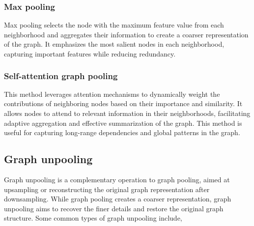 \subsubsection{Max pooling} Max pooling selects the node with the maximum feature value from each neighborhood and aggregates their information to create a coarser representation of the graph. It emphasizes the most salient nodes in each neighborhood, capturing important features while reducing redundancy.
\subsubsection{Self-attention graph pooling} This method leverages attention mechanisms to dynamically weight the contributions of neighboring nodes based on their importance and similarity. It allows nodes to attend to relevant information in their neighborhoods, facilitating adaptive aggregation and effective summarization of the graph. This method is useful for capturing long-range dependencies and global patterns in the graph.

\subsection{Graph unpooling}
Graph unpooling is a complementary operation to graph pooling, aimed at upsampling or reconstructing the original graph representation after downsampling. While graph pooling creates a coarser representation, graph unpooling aims to recover the finer details and restore the original graph structure. Some common types of graph unpooling include,

